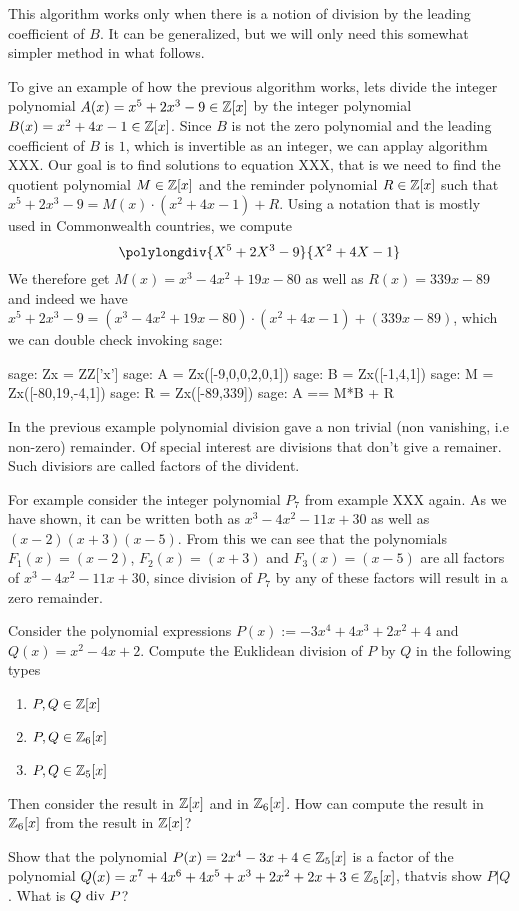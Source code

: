 This algorithm works only when there is a notion of division by the leading coefficient of $B$. It can be generalized, but we will only need this somewhat simpler method in what follows.
\begin{example} To give an example of how the previous algorithm works, lets divide the integer polynomial $A(x)=x^5+2x^3-9\in \mathbb{Z}[x]$ by the integer polynomial $B(x)=x^2+4x-1\in\mathbb{Z}[x]$. Since $B$ is not the zero polynomial and the leading coefficient of $B$ is $1$, which is invertible as an integer, we can applay algorithm XXX. Our goal is to find solutions to equation XXX, that is we need to find the quotient polynomial $M\in\mathbb{Z}[x]$ and the reminder polynomial $R \in \mathbb{Z}[x]$ such that $x^5+2x^3-9 = M(x)\cdot (x^2+4x-1) + R$. Using a notation that is mostly used in Commonwealth countries, we compute
\begin{equation}
\polylongdiv{X^5+2X^3-9}{X^2+4X-1}
\end{equation}
We therefore get $M(x)=x^3-4x^2+19x-80$ as well as $R(x)=339x-89$ and indeed we have $x^5+2x^3-9 = (x^3-4x^2+19x-80)\cdot (x^2+4x-1) + (339x-89)$, which we can double check invoking sage:
\begin{sagecommandline}
sage: Zx = ZZ['x']
sage: A = Zx([-9,0,0,2,0,1])
sage: B = Zx([-1,4,1])
sage: M = Zx([-80,19,-4,1])
sage: R = Zx([-89,339])
sage: A == M*B + R
\end{sagecommandline}
\end{example}
\begin{example} In the previous example polynomial division gave a non trivial (non vanishing, i.e non-zero) remainder. Of special interest are divisions that don't give a remainer. Such divisiors are called factors of the divident. 

For example consider the integer polynomial $P_7$ from example XXX again. As we have shown, it can be written both as $x^3 - 4 x^2 - 11 x + 30$ as well as $(x-2)(x + 3)(x-5)$. From this we can see that the polynomials $F_1(x)=(x-2)$, $F_2(x)=(x+3)$ and $F_3(x)=(x-5)$ are all factors of $x^3 - 4 x^2 - 11 x + 30$, since division of $P_7$ by any of these factors will result in a zero remainder.
\end{example}
\begin{exercise} Consider the polynomial expressions $P(x):= -3x^4 + 4x^3 + 2x^2 +4$ and $Q(x)= x^2-4x+2$. Compute the Euklidean division of $P$ by $Q$ in the following types
\begin{enumerate}
\item $P,Q\in \mathbb{Z}[x]$
\item $P,Q\in \mathbb{Z}_6[x]$
\item $P,Q\in \mathbb{Z}_5[x]$
\end{enumerate}
Then consider the result in $\mathbb{Z}[x]$ and in $\mathbb{Z}_6[x]$. How can compute the result in $\mathbb{Z}_6[x]$ from the result in $\mathbb{Z}[x]$?
\end{exercise}
\begin{exercise}
Show that the polynomial $P(x)= 2x^4-3x+4\in \mathbb{Z}_5[x]$ is a factor of the polynomial $Q(x)=x^7 + 4x^6 + 4x^5 + x^3 + 2x^2 + 2x + 3\in\mathbb{Z}_5[x]$, thatvis show $P|Q$. What is $Q \text{ div } P$?
\end{exercise}
